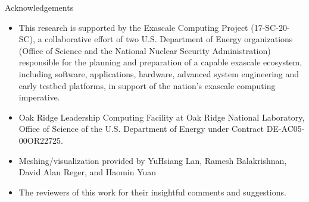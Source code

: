 \begin{frame}{Acknowledgements}
  \begin{itemize}
    \item This research is supported by the Exascale Computing Project (17-SC-20-SC),
          a collaborative effort of two U.S. Department of Energy organizations (Office of Science and the National Nuclear
          Security Administration) responsible for the planning and preparation of a capable exascale ecosystem,
          including software, applications, hardware,
          advanced system engineering and early testbed
          platforms, in support of the nation’s exascale computing imperative.
    \item Oak Ridge Leadership Computing Facility at Oak Ridge National
          Laboratory, Office of
          Science of the U.S. Department of Energy under
          Contract DE-AC05-00OR22725.
    \item Meshing/visualization provided by YuHsiang Lan, Ramesh Balakrishnan, David Alan Reger, and Haomin Yuan
    \item The reviewers of this work for their insightful comments and suggestions.
  \end{itemize}
\end{frame}